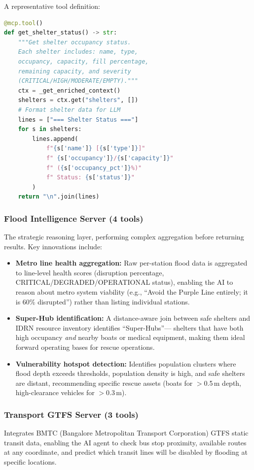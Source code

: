 \documentclass[journal]{IEEEtran}
\begin{document}
A representative tool definition:

\begin{lstlisting}[language=Python, caption={MCP tool for shelter status
    retrieval (simplified)}]
@mcp.tool()
def get_shelter_status() -> str:
    """Get shelter occupancy status.
    Each shelter includes: name, type,
    occupancy, capacity, fill percentage,
    remaining capacity, and severity
    (CRITICAL/HIGH/MODERATE/EMPTY)."""
    ctx = _get_enriched_context()
    shelters = ctx.get("shelters", [])
    # Format shelter data for LLM
    lines = ["=== Shelter Status ==="]
    for s in shelters:
        lines.append(
            f"{s['name']} [{s['type']}]"
            f" {s['occupancy']}/{s['capacity']}"
            f" ({s['occupancy_pct']}%)"
            f" Status: {s['status']}"
        )
    return "\n".join(lines)
\end{lstlisting}

\subsubsection{Flood Intelligence Server (4 tools)}
The strategic reasoning layer, performing complex aggregation before returning
results. Key innovations include:

\begin{itemize}[leftmargin=*]
    \item \textbf{Metro line health aggregation:} Raw per-station flood data
    is aggregated to line-level health scores (disruption percentage,
    CRITICAL/DEGRADED/OPERATIONAL status), enabling the AI to reason about
    metro system viability (e.g., ``Avoid the Purple Line entirely; it is
    60\% disrupted'') rather than listing individual stations.
    \item \textbf{Super-Hub identification:} A distance-aware join between
    safe shelters and IDRN resource inventory identifies ``Super-Hubs''---
    shelters that have both high occupancy \emph{and} nearby boats or medical
    equipment, making them ideal forward operating bases for rescue operations.
    \item \textbf{Vulnerability hotspot detection:} Identifies population
    clusters where flood depth exceeds thresholds, population density is
    high, and safe shelters are distant, recommending specific rescue assets
    (boats for $>$0.5\,m depth, high-clearance vehicles for $>$0.3\,m).
\end{itemize}

\subsubsection{Transport GTFS Server (3 tools)}
Integrates BMTC (Bangalore Metropolitan Transport Corporation) GTFS static
transit data, enabling the AI agent to check bus stop proximity, available
routes at any coordinate, and predict which transit lines will be disabled
by flooding at specific locations.
\end{document}
